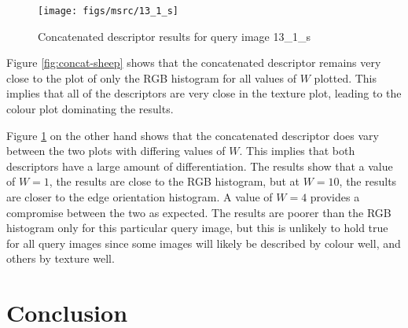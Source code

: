 \begin{figure}[ht]
	\begin{minipage}[]{0.3\linewidth}
		\centering
		\texttt{[image: figs/msrc/13\_1\_s]}
	\end{minipage}
	\begin{minipage}[]{0.7\linewidth}
		\centering
		\prplotclose
	\end{minipage}
	\caption{Concatenated descriptor results for query image 13\_1\_s}
	\label{fig:concat-books}
\end{figure}

Figure \ref{fig:concat-sheep} shows that the concatenated descriptor remains very close to the plot of only the RGB histogram for all values of $W$ plotted. This implies that all of the descriptors are very close in the texture plot, leading to the colour plot dominating the results.

Figure \ref{fig:concat-books} on the other hand shows that the concatenated descriptor does vary between the two plots with differing values of $W$. This implies that both descriptors have a large amount of differentiation. The results show that a value of $W=1$, the results are close to the RGB histogram, but at $W=10$, the results are closer to the edge orientation histogram. A value of $W=4$ provides a compromise between the two as expected. The results are poorer than the RGB histogram only for this particular query image, but this is unlikely to hold true for all query images since some images will likely be described by colour well, and others by texture well.

\chapter{Conclusion} \label{sec:conclusion}
